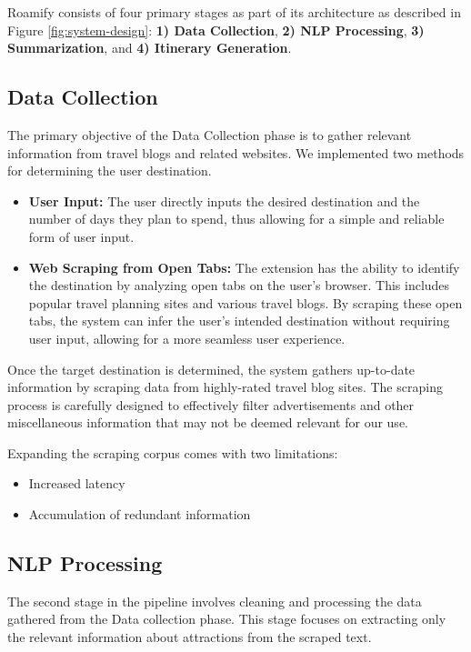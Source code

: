 \documentclass[manuscript,review,anonymous]{acmart}
\begin{document}
    Roamify consists of four primary stages as part of its architecture as described in Figure \ref{fig:system-design}: \textbf{1) Data Collection}, \textbf{2) NLP Processing}, \textbf{3) Summarization}, and \textbf{4) Itinerary Generation}.
    
    \vspace{-7pt}
    
    \subsection{Data Collection}
        The primary objective of the Data Collection phase is to gather relevant information from travel blogs and related websites. We implemented two methods for determining the user destination.
        
        \begin{itemize}
            \item \textbf{User Input:} The user directly inputs the desired destination and the number of days they plan to spend, thus allowing for a simple and reliable form of user input.
            
            \item \textbf{Web Scraping from Open Tabs:} The extension has
            the ability to identify the destination by analyzing open tabs on the user’s browser. This includes popular travel planning sites and various travel blogs. By scraping these open tabs, the system can infer the user’s intended destination without requiring user input, allowing for a more seamless user experience.
        \end{itemize}
        
        Once the target destination is determined, the system gathers up-to-date information by scraping data from highly-rated travel blog sites. The scraping process is carefully designed to effectively filter advertisements and other miscellaneous information that may not be deemed relevant for our use.
        
        Expanding the scraping corpus comes with two limitations:
        \begin{itemize}
            \item Increased latency
            \item Accumulation of redundant information
        \end{itemize}
    
    \vspace{-7pt}
    
    \subsection{NLP Processing}
        The second stage in the pipeline involves cleaning and processing the data gathered from the Data collection phase. This stage focuses on extracting only the relevant information about attractions from the scraped text.
        
\end{document}
